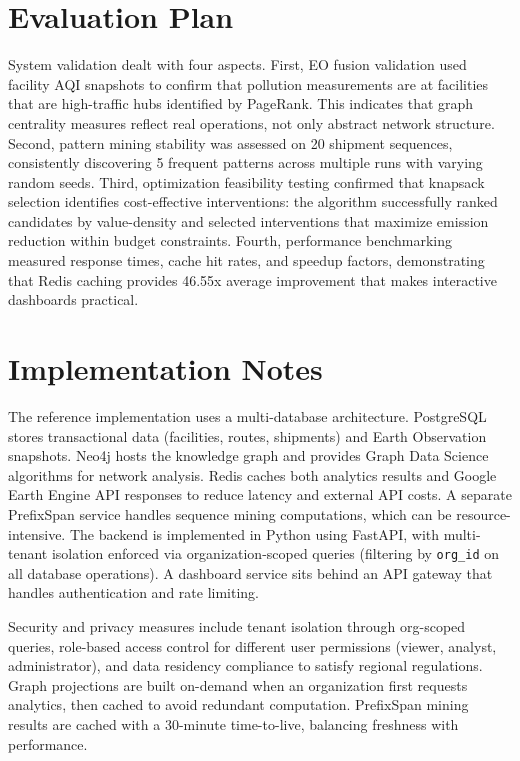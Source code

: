 \documentclass[conference]{IEEEtran}
\begin{document}
\section{Evaluation Plan}
System validation dealt with four aspects. First, EO fusion validation used facility AQI snapshots to confirm that pollution measurements are at facilities that are high-traffic hubs identified by PageRank. This indicates that graph centrality measures reflect real operations, not only abstract network structure. Second, pattern mining stability was assessed on 20 shipment sequences, consistently discovering 5 frequent patterns across multiple runs with varying random seeds. Third, optimization feasibility testing confirmed that knapsack selection identifies cost-effective interventions: the algorithm successfully ranked candidates by value-density and selected interventions that maximize emission reduction within budget constraints. Fourth, performance benchmarking measured response times, cache hit rates, and speedup factors, demonstrating that Redis caching provides 46.55x average improvement that makes interactive dashboards practical.

\section{Implementation Notes}
The reference implementation uses a multi-database architecture. PostgreSQL stores transactional data (facilities, routes, shipments) and Earth Observation snapshots. Neo4j hosts the knowledge graph and provides Graph Data Science algorithms for network analysis. Redis caches both analytics results and Google Earth Engine API responses to reduce latency and external API costs. A separate PrefixSpan service handles sequence mining computations, which can be resource-intensive. The backend is implemented in Python using FastAPI, with multi-tenant isolation enforced via organization-scoped queries (filtering by \texttt{org\_id} on all database operations). A dashboard service sits behind an API gateway that handles authentication and rate limiting.

Security and privacy measures include tenant isolation through org-scoped queries, role-based access control for different user permissions (viewer, analyst, administrator), and data residency compliance to satisfy regional regulations. Graph projections are built on-demand when an organization first requests analytics, then cached to avoid redundant computation. PrefixSpan mining results are cached with a 30-minute time-to-live, balancing freshness with performance.
\end{document}
